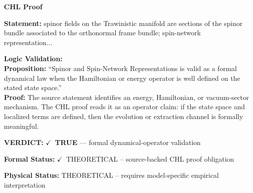 \vspace{0.45em}
\noindent\textbf{CHL Proof}\par
\textbf{Statement:} spinor fields on the Trawinistic manifold are sections of the spinor bundle associated
to the orthonormal frame bundle; spin-network representation...

\textbf{Logic Validation:}\\
\textbf{Proposition:} ``Spinor and Spin-Network Representations is valid as a formal dynamical law when the
Hamiltonian or energy operator is well defined on the stated state space.''\\
\textbf{Proof:} The source statement identifies an energy, Hamiltonian, or vacuum-sector mechanism. The
CHL proof reads it as an operator claim: if the state space and localized terms are
defined, then the evolution or extraction channel is formally meaningful.

\textbf{VERDICT:} \ensuremath{\checkmark}\ \textbf{TRUE} --- formal dynamical-operator validation

\textbf{Formal Status:} \ensuremath{\checkmark}\ THEORETICAL -- source-backed CHL proof obligation

\textbf{Physical Status:} THEORETICAL -- requires model-specific empirical interpretation
\par\vspace{0.45em}
\par
\ifTZPDarkEdition
{}
\fi
\endgroup
\endgroup
